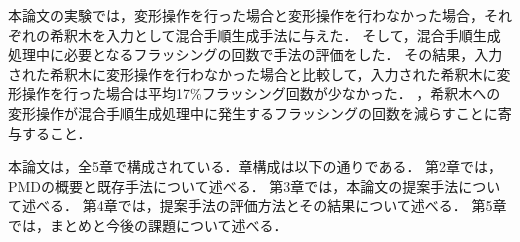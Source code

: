 本論文の実験では，変形操作を行った場合と変形操作を行わなかった場合，それぞれの希釈木を入力として混合手順生成手法に与えた．
そして，混合手順生成処理中に必要となるフラッシングの回数で手法の評価をした．
その結果，入力された希釈木に変形操作を行わなかった場合と比較して，入力された希釈木に変形操作を行った場合は平均17\%フラッシング回数が少なかった．
，希釈木への変形操作が混合手順生成処理中に発生するフラッシングの回数を減らすことに寄与すること．

本論文は，全5章で構成されている．章構成は以下の通りである．
第2章では，PMDの概要と既存手法について述べる．
第3章では，本論文の提案手法について述べる．
第4章では，提案手法の評価方法とその結果について述べる．
第5章では，まとめと今後の課題について述べる．

% 
